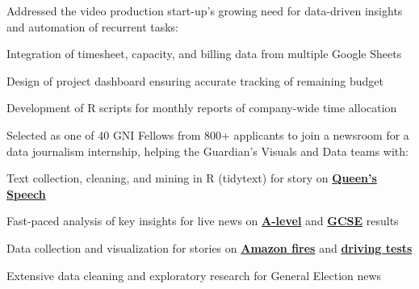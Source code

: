\documentclass[]{deedy-resume-openfont}
\begin{document}
\begin{minipage}[t]{0.66\textwidth}
Addressed the video production start-up's growing need for data-driven insights and automation of recurrent tasks:
\begin{tightemize}
\item Integration of timesheet, capacity, and billing data from multiple Google Sheets 
\item Design of project dashboard ensuring accurate tracking of remaining budget 
\item Development of R scripts for monthly reports of company-wide time allocation
\end{tightemize}


\sectionsep

Selected as one of 40 GNI Fellows from 800+ applicants to join a newsroom for a data journalism internship, helping the Guardian's Visuals and Data teams with:
\begin{tightemize}
\item Text collection, cleaning, and mining in R (tidytext) for story on \href{https://www.theguardian.com/politics/ng-interactive/2019/oct/14/how-unusual-language-boris-johnson-first-queens-speech}{\bf Queen's Speech}
\item Fast-paced analysis of key insights for live news on \href{https://www.theguardian.com/education/live/2019/aug/15/a-level-results-2019-students-await-results-from-reformed-exams-live?}{\bf A-level} and \href{https://www.theguardian.com/education/live/2019/aug/22/gcse-results-day-2019-live-news}{\bf GCSE} results
\item Data collection and visualization for stories on \href{https://www.theguardian.com/environment/2019/aug/23/amazon-fires-what-is-happening-anything-we-can-do?}{\bf Amazon fires} and \href{https://www.theguardian.com/world/2019/aug/23/an-easy-ride-scottish-village-fuels-debate-driving-test-pass-rates}{\bf driving tests}
\item Extensive data cleaning and exploratory research for General Election news
\end{tightemize}
\sectionsep


\end{minipage}
\end{document}
